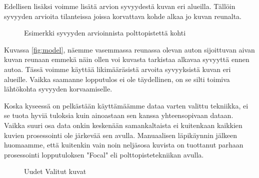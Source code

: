 Edellisen lisäksi voimme lisätä arvion syvyydestä kuvan eri alueilla. 
Tällöin syvyyden arvioita tilanteissa joissa korvattava kohde alkaa jo kuvan reunalta.

\begin{figure}[h]
\centering
{}
\caption{Esimerkki syvyyden arvioinnista polttopistettä kohti}
\label{fig:polttopiste_2}
\end{figure}
    
Kuvassa \ref{fig:model}, näemme vasemmassa reunassa olevan auton sijoittuvan aivan kuvan reunaan 
emmekä näin ollen voi kuvasta tarkistaa alkavaa syvyyttä ennen autoa.
Tässä voimme käyttää likimääräsistä arvoita syvyyksistä kuvan eri alueille. Vaikka saamanne lopputulos ei ole täydellinen,
on se silti toimiva lähtökohta syvyyden korvaamiselle.

Koska kyseessä on pelkästään käyttämäämme dataa varten valittu tekniikka, ei se tuota hyviä tuloksia kuin ainoastaan sen kanssa yhteensopivaan dataan.
Vaikka suuri osa data onkin keskenään samankaltaista ei kuitenkaan kaikkien kuvien prosessointi ole järkevää sen avulla.
Manuaalisen läpikäynnin jälkeen huomaamme, että kuitenkin vain noin neljäsosa kuvista on tuottanut parhaan prosessointi lopputuloksen "Focal" eli polttopistetekniikan avulla. 

\begin{figure}[h]
\centering
{}
\caption{Uudet Valitut kuvat}
\label{fig:selected2}
\end{figure}

